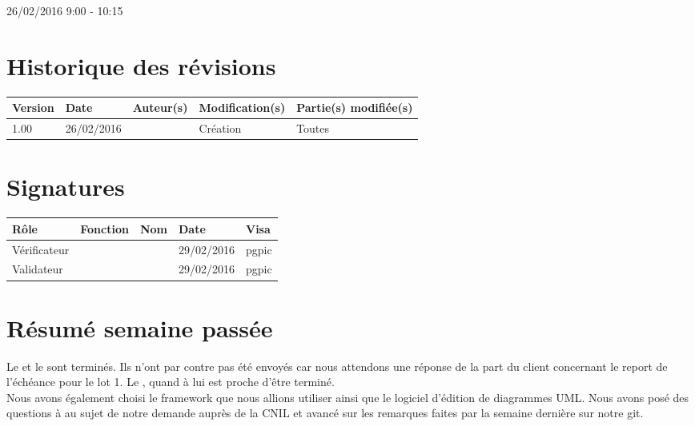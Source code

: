 \documentclass [a4paper] {article}
\begin{document}
26/02/2016			 				%
\hfill   
\hfill 	 9:00 - 10:15 				%


\section*{Historique des révisions}
\begin{center}
			\begin{tabular}{| p{2.5cm} | p{3cm} | p{3cm} | p{3cm} | p{3.5cm} |}
				\hline
				\rowcolor{Gray}
				Version & Date & Auteur(s) & Modification(s) & Partie(s) modifiée(s)		 \\
				\hline
				1.00 & 26/02/2016 & \Pierre & Création & Toutes \\
		\hline		
			\end{tabular}
		\end{center}

\section*{Signatures}

		\begin{center}
			\begin{tabular}{| p{2.5cm} | p{4cm} | p{3cm} | p{3cm} | p{2.5cm} |}
				\hline
				\rowcolor{Gray}
				Rôle & Fonction & Nom & Date & Visa		 \\
				\hline
				Vérificateur & \RGC & \Mathieu & 29/02/2016 & pgpic \\[30pt]
				\hline
				Validateur & \CP & \Sergi & 29/02/2016 & pgpic \\[30pt]	
				\hline
			\end{tabular}
		\end{center}


\section{Résumé semaine passée}
Le \DSE{} et le \PTV{} sont terminés. Ils n'ont par contre pas été envoyés car nous attendons une réponse de la part du client concernant le report de l'échéance pour le lot 1. Le \DSI{}, quand à lui est proche d'être terminé.
\\
Nous avons également choisi le framework que nous allions utiliser ainsi que le logiciel d'édition de diagrammes UML. Nous avons posé des questions à \nomTuteurQualite{} au sujet de notre demande auprès de la CNIL et avancé sur les remarques faites par \nomTuteurPedago{} la semaine dernière sur notre git.
\end{document}
